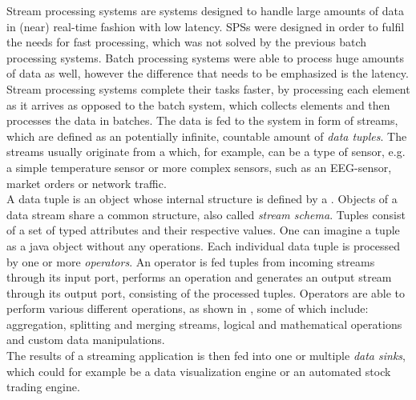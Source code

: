         \quad Stream processing systems are systems designed to handle large amounts of data in (near) real-time fashion with low latency.
        SPSs were designed in order to fulfil the needs for fast processing, which was not solved by the previous batch processing systems.
        Batch processing systems were able to process huge amounts of data as well, however the difference that needs to be emphasized is the latency.
        Stream processing systems complete their tasks faster, by processing each element as it arrives as opposed to the batch system, which collects elements 
        and then processes the data in batches.
        The data is fed to the system in form of streams, which are defined as an potentially infinite, countable amount of \textit{data tuples}. 
        The streams usually originate from a  which, for example, can be a type of sensor, e.g. a simple temperature sensor or more complex sensors, 
        such as an EEG-sensor, market orders or network traffic.
        \\
        A data tuple is an object whose internal structure is defined by a . 
        Objects of a data stream share a common structure, also called \textit{stream schema}.
        Tuples consist of a set of typed attributes and their respective values. One can imagine a tuple as a java object without any operations.\cite{fundamentals}
        Each individual data tuple is processed by one or more \textit{operators}.
        An operator is fed tuples from incoming streams through its input port, performs an operation and generates an output stream through its output port, 
        consisting of the processed tuples. Operators are able to perform various different operations, 
        as shown in \cite[p.49]{fundamentals}, some of which include: aggregation, splitting and merging streams, 
        logical and mathematical operations and custom data manipulations.
        \\
        The results of a streaming application is then fed into one or multiple \textit{data sinks}, which could for example be a data visualization engine 
        or an automated stock trading engine.
        
